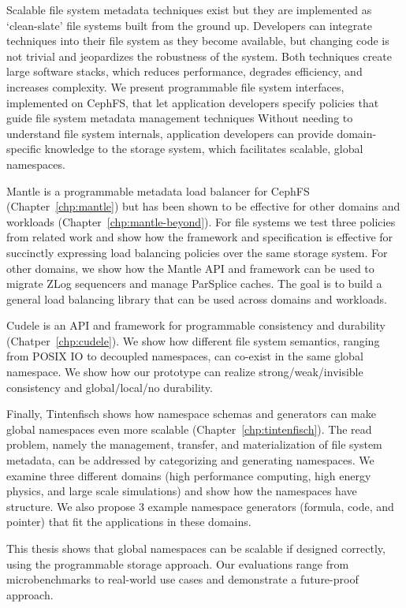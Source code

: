 Scalable file system metadata techniques exist but they are implemented as
`clean-slate' file systems built from the ground up. Developers can integrate
techniques into their file system as they become available, but changing code
is not trivial and jeopardizes the robustness of the system. Both techniques
create large software stacks, which reduces performance, degrades efficiency,
and increases complexity. We present programmable file system interfaces,
implemented on CephFS, that let application developers specify policies that
guide file system metadata management techniques Without needing to understand
file system internals, application developers can provide domain-specific
knowledge to the storage system, which facilitates scalable, global namespaces.

Mantle is a programmable metadata load balancer for CephFS
(Chapter~\ref{chp:mantle}) but has been shown to be effective for other domains
and workloads (Chapter~\ref{chp:mantle-beyond}). For file systems we test three
policies from related work and show how the framework and specification is
effective for succinctly expressing load balancing policies over the same
storage system. For other domains, we show how the Mantle API and framework can
be used to migrate ZLog sequencers and manage ParSplice caches. The goal is to
build a general load balancing library that can be used across domains and
workloads.

Cudele is an API and framework for programmable consistency and durability
(Chatper~\ref{chp:cudele}). We show how different file system semantics,
ranging from POSIX IO to decoupled namespaces, can co-exist in the same global
namespace. We show how our prototype can realize strong/weak/invisible
consistency and global/local/no durability.

Finally, Tintenfisch shows how namespace schemas and generators can make global
namespaces even more scalable (Chapter~\ref{chp:tintenfisch}). The read
problem, namely the management, transfer, and materialization of file system
metadata, can be addressed by categorizing and generating namespaces. We
examine three different domains (high performance computing, high energy
physics, and large scale simulations) and show how the namespaces have
structure. We also propose 3 example namespace generators (formula, code, and
pointer) that fit the applications in these domains.

This thesis shows that global namespaces can be scalable if designed correctly,
using the programmable storage approach. Our evaluations range from
microbenchmarks to real-world use cases and demonstrate a future-proof
approach.
